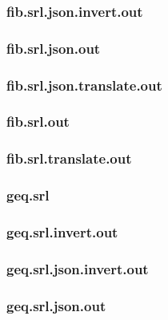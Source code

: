 \subsubsection{fib.srl.json.invert.out}
\label{app:fib_srl.json.invert.out}

\subsubsection{fib.srl.json.out}
\label{app:fib_srl.json.out}

\subsubsection{fib.srl.json.translate.out}
\label{app:fib_srl.json.translate.out}

\subsubsection{fib.srl.out}
\label{app:fib_srl.out}

\subsubsection{fib.srl.translate.out}
\label{app:fib_srl.translate.out}

\subsubsection{geq.srl}
\label{app:geq_srl}

\subsubsection{geq.srl.invert.out}
\label{app:geq_srl.invert.out}

\subsubsection{geq.srl.json.invert.out}
\label{app:geq_srl.json.invert.out}

\subsubsection{geq.srl.json.out}
\label{app:geq_srl.json.out}

